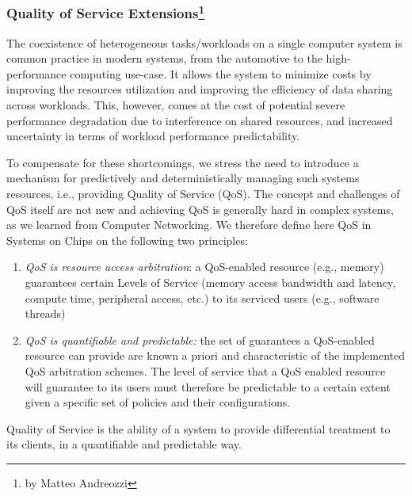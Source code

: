 \subsubsection[Quality of Service Extensions]{Quality of Service Extensions\footnote{by Matteo Andreozzi}}

The coexistence of heterogeneous tasks/workloads on a single computer system is common practice in modern systems, from the automotive to the high-performance computing use-case.
It allows the system to minimize costs by improving the resources utilization and improving the efficiency of data sharing across workloads.
This, however, comes at the cost of potential severe performance degradation due to interference on shared resources, and increased uncertainty in terms of workload performance predictability.

To compensate for these shortcomings, we stress the need to introduce a mechanism for predictively and deterministically managing such systems resources, i.e., providing Quality of Service (QoS).
The concept and challenges of QoS itself are not new and achieving QoS is generally hard in complex systems, as we learned from Computer Networking.
We therefore define here QoS in Systems on Chips on the following two principles:
\begin{enumerate}
    \item \emph{QoS is resource access arbitration}: a QoS-enabled resource (e.g., memory) guarantees certain Levels of Service (memory access bandwidth and latency, compute time, peripheral access, etc.) to its serviced users (e.g., software threads)
    \item \emph{QoS is quantifiable and predictable:} the set of guarantees a QoS-enabled resource can provide are known a priori and characteristic of the implemented QoS arbitration schemes.
    The level of service that a QoS enabled resource will guarantee to its users must therefore be predictable to a certain extent given a specific set of policies and their configurations.
\end{enumerate}

Quality of Service is the ability of a system to provide differential treatment to its clients, in a quantifiable and predictable way.

